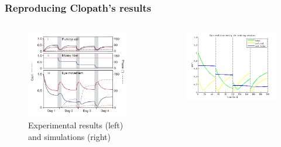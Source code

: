 \documentclass[10pt, compress]{beamer}
\begin{document}
\begin{frame}[fragile]
  \frametitle{Reproducing Clopath's results}
  \begin{columns}[onlytextwidth]
      \begin{figure}
        \includegraphics[scale=0.25]{images/gain.png}
        \caption{Experimental results (left) and simulations (right)}
      \end{figure}
    \begin{figure}
      \includegraphics[scale=0.35]{images/longnoi_12.png}
      \newline

\end{figure}
\end{columns}
\end{frame}
\end{document}
